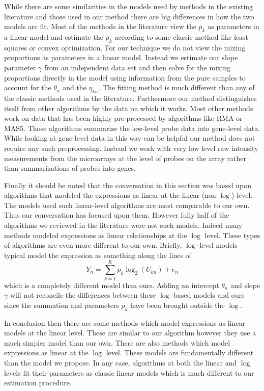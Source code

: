 \documentclass[reqno,12pt,oneside]{report}\usepackage[]{graphicx}\usepackage[]{color}
\theoremstyle{plain}
\theoremstyle{definition}
\theoremstyle{remark}
\numberwithin{theorem}{chapter}     %
\begin{document}
While there are some similarities in the models used by methods in the existing literature and those used in our method there are big differences in how the two models are fit. Most of the methods in the literature view the $p_k$ as parameters in a linear model and estimate the $p_k$ according to some classic method like least squares or convex optimization. For our technique we do not view the mixing proportions as parameters in a linear model. Instead we estimate our slope parameter $\gamma$ from an independent data set and then solve for the mixing proportions directly in the model using information from the pure samples to account for the $\theta_n$ and the $\eta_{kn}$. The fitting method is much different than any of the classic methods used in the literature. Furthermore our method distinguishes itself from other algorithms by the data on which it works. Most other methods work on data that has been highly pre-processed by algorithms like RMA or MAS5. Those algorithms summarize the low-level probe data into gene-level data. While looking at gene-level data in this way can be helpful our method does not require any such preprocessing. Instead we work with very low level raw intensity measurements from the microarrays at the level of probes on the array rather than summarizations of probes into genes. 

Finally it should be noted that the conversation in this section was based upon algorithms that modeled the expressions as linear at the linear (non-$\log$) level. The models used such  linear-level algorithms are most comparable to our own. Thus our conversation has focused upon them. However fully half of the algorithms we reviewed in the literature were not such models. Indeed many methods modeled expressions as linear relationships at the $\log$ level. These types of algorithms are even more different to our own. Briefly, $\log$-level models typical model the expression as something along the lines of 
\[
Y_n = \sum_{k=1}^{K}p_k \log_2\left(U_{kn}\right) + e_{n}
\]
which is a completely different model than ours. Adding an intercept $\theta_n$ and slope $\gamma$ will not reconcile the differences between these $\log$-based models and ours since the summation and parameters $p_k$ have been brought outside the $\log$.

In conclusion then there are some methods which model expressions as linear models at the linear level. These are similar to our algorithm however they use a much simpler model than our own. There are also methods which model expressions as linear at the $\log$ level. These models are fundamentally different than the model we propose. In any case, algorithms at both the linear and $\log$ levels fit their parameters as classic linear models which is much different to our estimation procedure. 
\end{document}

